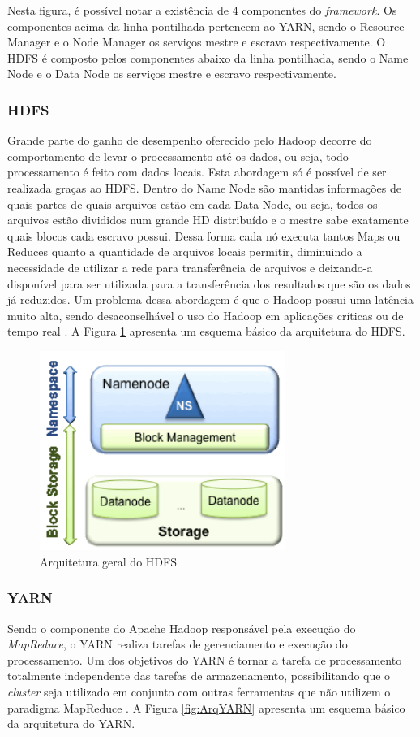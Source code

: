 Nesta figura, é possível notar a existência de 4 componentes do \textit{framework}. Os componentes acima da linha pontilhada pertencem ao YARN, sendo o Resource Manager e o Node Manager os serviços mestre e escravo respectivamente. O HDFS é composto pelos componentes abaixo da linha pontilhada, sendo o Name Node e o Data Node os serviços mestre e escravo respectivamente.

\subsubsection{HDFS}
Grande parte do ganho de desempenho oferecido pelo Hadoop decorre do comportamento de levar o processamento até os dados, ou seja, todo processamento é feito com dados locais. Esta abordagem só é possível de ser realizada graças ao HDFS. Dentro do Name Node são mantidas informações de quais partes de quais arquivos estão em cada Data Node, ou seja, todos os arquivos estão divididos num grande HD distribuído e o mestre sabe exatamente quais blocos cada escravo possui. Dessa forma cada nó executa tantos Maps ou Reduces quanto a quantidade de arquivos locais permitir, diminuindo a necessidade de utilizar a rede para transferência de arquivos e deixando-a disponível para ser utilizada para a transferência dos resultados que são os dados já reduzidos. Um problema dessa abordagem é que o Hadoop possui uma latência muito alta, sendo desaconselhável o uso do Hadoop em aplicações críticas ou de tempo real \cite{BookHadoop}. A Figura \ref{fig:ArqHDFS} apresenta um esquema básico da arquitetura do HDFS.

\begin{figure}[!hbtn]
   \centering
   \includegraphics[width=8cm]{figuras/Figura07-HDFS.png}
   \caption{Arquitetura geral do HDFS \cite{HDFS}}
   \label{fig:ArqHDFS}
\end{figure}

\subsubsection{YARN}
Sendo o componente do Apache Hadoop responsável pela execução do \emph{MapReduce}, o YARN realiza tarefas de gerenciamento e execução do processamento. Um dos objetivos do YARN é tornar a tarefa de processamento totalmente independente das tarefas de armazenamento, possibilitando que o \textit{cluster} seja utilizado em conjunto com outras ferramentas que não utilizem o paradigma MapReduce \cite{Vavilapalli}. A Figura \ref{fig:ArqYARN} apresenta um esquema básico da arquitetura do YARN.

